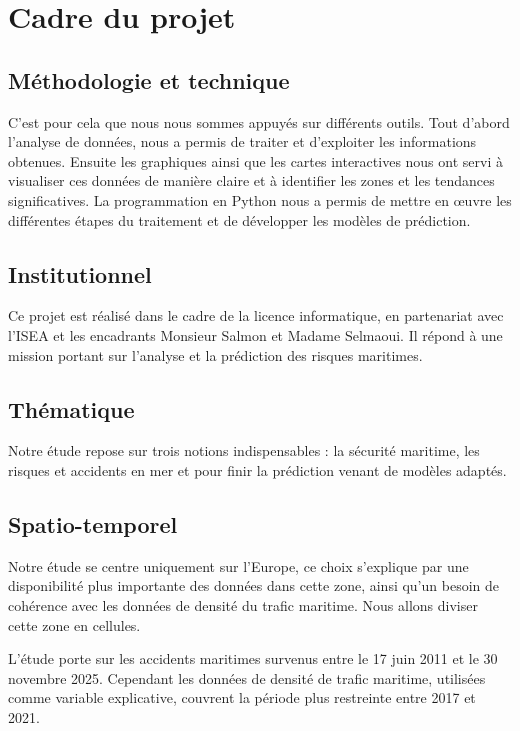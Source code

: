 \documentclass[12pt, a4paper]{report}
\begin{document}
\section{Cadre du projet}

\subsection{Méthodologie et technique}

C'est pour cela que nous nous sommes appuyés sur différents outils. Tout d'abord l'analyse de données, nous a permis de traiter et d'exploiter les informations obtenues. Ensuite les graphiques ainsi que les cartes interactives nous ont servi à visualiser ces données de manière claire et à identifier les zones et les tendances significatives. La programmation en Python nous a permis de mettre en œuvre les différentes étapes du traitement et de développer les modèles de prédiction.

\subsection{Institutionnel}

Ce projet est réalisé dans le cadre de la licence informatique, en partenariat avec l'ISEA et les encadrants Monsieur Salmon et Madame Selmaoui. Il répond à une mission portant sur l'analyse et la prédiction des risques maritimes.

\subsection{Thématique}

Notre étude repose sur trois notions indispensables : la sécurité maritime, les risques et accidents en mer et pour finir la prédiction venant de modèles adaptés.

\subsection{Spatio-temporel}


Notre étude se centre uniquement sur l'Europe, ce choix s'explique par une disponibilité plus importante des données dans cette zone, ainsi qu'un besoin de cohérence avec les données de densité du trafic maritime. Nous allons diviser cette zone en cellules.

L'étude porte sur les accidents maritimes survenus entre le 17 juin 2011 et le 30 novembre 2025. Cependant les données de densité de trafic maritime, utilisées comme variable explicative, couvrent la période plus restreinte entre 2017 et 2021.
\end{document}

